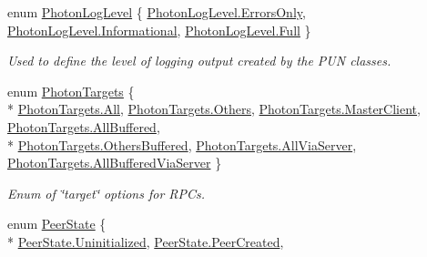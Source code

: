 \begin{DoxyCompactItemize}
\item 
enum \hyperlink{group__public_api_gaf0468f6a0c8ab8caec09678e6dc6f3d5}{Photon\+Log\+Level} \{ \hyperlink{group__public_api_ggaf0468f6a0c8ab8caec09678e6dc6f3d5ae0a1284706116eec7a83a489235a9ef8}{Photon\+Log\+Level.\+Errors\+Only}, 
\hyperlink{group__public_api_ggaf0468f6a0c8ab8caec09678e6dc6f3d5a5391f9a882a54c787b206138ed6d28b0}{Photon\+Log\+Level.\+Informational}, 
\hyperlink{group__public_api_ggaf0468f6a0c8ab8caec09678e6dc6f3d5abbd47109890259c0127154db1af26c75}{Photon\+Log\+Level.\+Full}
 \}\begin{DoxyCompactList}\small\item\em Used to define the level of logging output created by the P\+UN classes. \end{DoxyCompactList}
\item 
enum \hyperlink{group__public_api_gab84b274b6aa3b3a3d7810361da16170f}{Photon\+Targets} \{ \\*
\hyperlink{group__public_api_ggab84b274b6aa3b3a3d7810361da16170fab1c94ca2fbc3e78fc30069c8d0f01680}{Photon\+Targets.\+All}, 
\hyperlink{group__public_api_ggab84b274b6aa3b3a3d7810361da16170fa52ef9633d88a7480b3a938ff9eaa2a25}{Photon\+Targets.\+Others}, 
\hyperlink{group__public_api_ggab84b274b6aa3b3a3d7810361da16170fad0209f4a40060d6e7c37d29979d8f444}{Photon\+Targets.\+Master\+Client}, 
\hyperlink{group__public_api_ggab84b274b6aa3b3a3d7810361da16170faf1983fc6b424304e28f91977e06f5881}{Photon\+Targets.\+All\+Buffered}, 
\\*
\hyperlink{group__public_api_ggab84b274b6aa3b3a3d7810361da16170fa7eb09c07159c5b57395510a1c3755705}{Photon\+Targets.\+Others\+Buffered}, 
\hyperlink{group__public_api_ggab84b274b6aa3b3a3d7810361da16170fa07d978b16f68f868668a6384df9bc11b}{Photon\+Targets.\+All\+Via\+Server}, 
\hyperlink{group__public_api_ggab84b274b6aa3b3a3d7810361da16170fa2dd089935363426140d8d54fee80464c}{Photon\+Targets.\+All\+Buffered\+Via\+Server}
 \}\begin{DoxyCompactList}\small\item\em Enum of \char`\"{}target\char`\"{} options for R\+P\+Cs. \end{DoxyCompactList}
\item 
enum \hyperlink{group__public_api_ga91cc003c03acb26c6f1530440ebdbc88}{Peer\+State} \{ \\*
\hyperlink{group__public_api_gga91cc003c03acb26c6f1530440ebdbc88af704f57ea420275ad51bf55b7dec2c96}{Peer\+State.\+Uninitialized}, 
\hyperlink{group__public_api_gga91cc003c03acb26c6f1530440ebdbc88a8f20319172b2aa6813ba3359f8790a39}{Peer\+State.\+Peer\+Created}, 

\end{DoxyCompactItemize}
